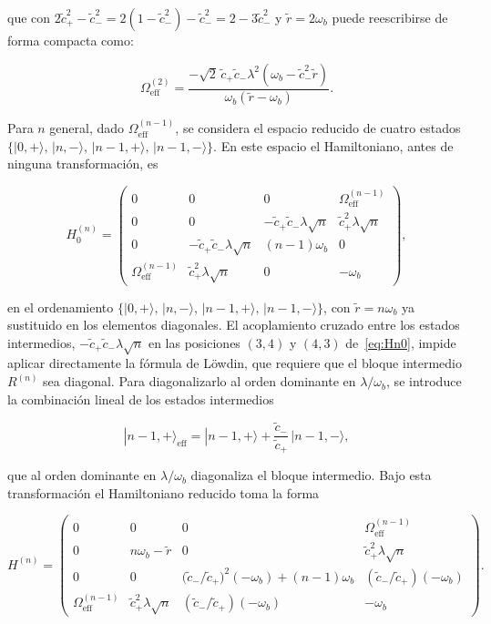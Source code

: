 que con $2\tilde{c}_+^2 - \tilde{c}_-^2 = 2(1-\tilde{c}_-^2) - \tilde{c}_-^2 = 2 - 3\tilde{c}_-^2$ y $\tilde{r} = 2\omega_b$ puede reescribirse de forma compacta como:

\begin{equation}
	\Omega_\mathrm{eff}^{(2)}
	= \frac{-\sqrt{2}\,\tilde{c}_+\tilde{c}_-\lambda^2
		(\omega_b - \tilde{c}_-^2\tilde{r})}
	{\omega_b(\tilde{r} - \omega_b)}.
	\label{eq:Oeff2_III}
\end{equation}

Para $n$ general, dado $\Omega_\mathrm{eff}^{(n-1)}$, se considera el espacio reducido de cuatro estados $\{|0,{+}\rangle,\,|n,{-}\rangle,\,|n-1,{+}\rangle,\,|n-1,{-}\rangle\}$. En este espacio el Hamiltoniano, antes de ninguna transformación, es

\begin{equation}
	H^{(n)}_0 = \begin{pmatrix}
		0 & 0 & 0 & \Omega_\mathrm{eff}^{(n-1)} \\[4pt]
		0 & 0 & -\tilde{c}_+\tilde{c}_-\lambda\sqrt{n} &
		\tilde{c}_+^2\lambda\sqrt{n} \\[4pt]
		0 & -\tilde{c}_+\tilde{c}_-\lambda\sqrt{n} & (n-1)\omega_b & 0 \\[4pt]
		\Omega_\mathrm{eff}^{(n-1)} & \tilde{c}_+^2\lambda\sqrt{n} & 0 & -\omega_b
	\end{pmatrix},
	\label{eq:Hn0}
\end{equation}

en el ordenamiento $\{|0,{+}\rangle,\,|n,{-}\rangle,\,|n-1,{+}\rangle,\,|n-1,{-}\rangle\}$, con $\tilde{r} = n\omega_b$ ya sustituido en los elementos diagonales. El acoplamiento cruzado entre los estados intermedios, $-\tilde{c}_+\tilde{c}_-\lambda\sqrt{n}$ en las posiciones $(3,4)$ y $(4,3)$ de~\eqref{eq:Hn0}, impide aplicar directamente la fórmula de Löwdin, que requiere que el bloque intermedio $R^{(n)}$ sea diagonal. Para diagonalizarlo al orden dominante en $\lambda/\omega_b$, se introduce la combinación lineal de los estados intermedios

\begin{equation}
	|n-1,{+}\rangle_\mathrm{eff}
	= |n-1,{+}\rangle + \frac{\tilde{c}_-}{\tilde{c}_+}\,|n-1,{-}\rangle,
	\label{eq:estado_eff}
\end{equation}

que al orden dominante en $\lambda/\omega_b$ diagonaliza el bloque intermedio. Bajo esta transformación el Hamiltoniano reducido toma la forma

\begin{equation}
	H^{(n)} = \begin{pmatrix}
		0 & 0 & 0 & \Omega_\mathrm{eff}^{(n-1)} \\[4pt]
		0 & n\omega_b - \tilde{r} & 0 & \tilde{c}_+^2\lambda\sqrt{n} \\[4pt]
		0 & 0 &
		\bigl(\tilde{c}_-/\tilde{c}_+\bigr)^2(-\omega_b) + (n-1)\omega_b &
		(\tilde{c}_-/\tilde{c}_+)(-\omega_b) \\[8pt]
		\Omega_\mathrm{eff}^{(n-1)} & \tilde{c}_+^2\lambda\sqrt{n} &
		(\tilde{c}_-/\tilde{c}_+)(-\omega_b) & -\omega_b
	\end{pmatrix}.
	\label{eq:Hn_transf}
\end{equation}

